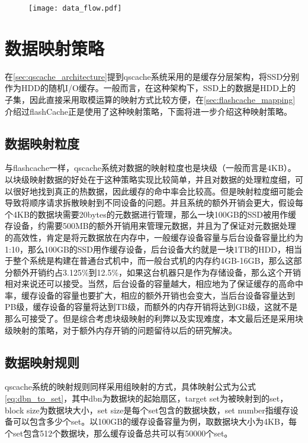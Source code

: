 \begin{figure}[H]
    \centering
    \texttt{[image: data\_flow.pdf]}
\end{figure}

\section{数据映射策略}
在\ref{sec:qscache_architecture}提到qscache系统采用的是缓存分层架构，将SSD分别作为HDD的随机I/O缓存。一般而言，在这种架构下，SSD上的数据是HDD上的子集，因此直接采用取模运算的映射方式比较方便，在\ref{sec:flashcache_mapping}介绍过flashCache正是使用了这种映射策略，下面将进一步介绍这种映射策略。 

\subsection{数据映射粒度}

与flashcache一样，qscache系统对数据的映射粒度也是块级（一般而言是4KB）。以块级映射数据的好处在于这种策略实现比较简单，并且对数据的处理粒度细，可以很好地找到真正的热数据，因此缓存的命中率会比较高。但是映射粒度细可能会导致将顺序请求拆散映射到不同设备的问题。并且系统的额外开销会更大，假设每个4KB的数据块需要20bytes的元数据进行管理，那么一块100GB的SSD被用作缓存设备，约需要500MB的额外开销用来管理元数据，并且为了保证对元数据处理的高效性，肯定是将元数据放在内存中，一般缓存设备容量与后台设备容量比约为1:10，那么100GB的SSD用作缓存设备，后台设备大约就是一块1TB的HDD，相当于整个系统是构建在普通台式机中，而一般台式机的内存约4GB-16GB，那么这部分额外开销约占3.125\%到12.5\%，如果这台机器只是作为存储设备，那么这个开销相对来说还可以接受。当然，后台设备的容量越大，相应地为了保证缓存的高命中率，缓存设备的容量也要扩大，相应的额外开销也会变大，当后台设备容量达到PB级，缓存设备的容量将达到TB级，而额外的内存开销将达到GB级，这就不是那么可接受了。但是综合考虑块级映射的利弊以及实现难度，本文最后还是采用块级映射的策略，对于额外内存开销的问题留待以后的研究解决。

\subsection{数据映射规则}

qscache系统的映射规则同样采用组映射的方式，具体映射公式为公式\ref{eq:dbn_to_set}，其中dbn为数据块的起始扇区，target set为被映射到的set，block size为数据块大小，set size是每个set包含的数据块数，set number指缓存设备可以包含多少个set。以100GB的缓存设备容量为例，取数据块大小为4KB，每个set包含512个数据块，那么缓存设备总共可以有50000个set。

